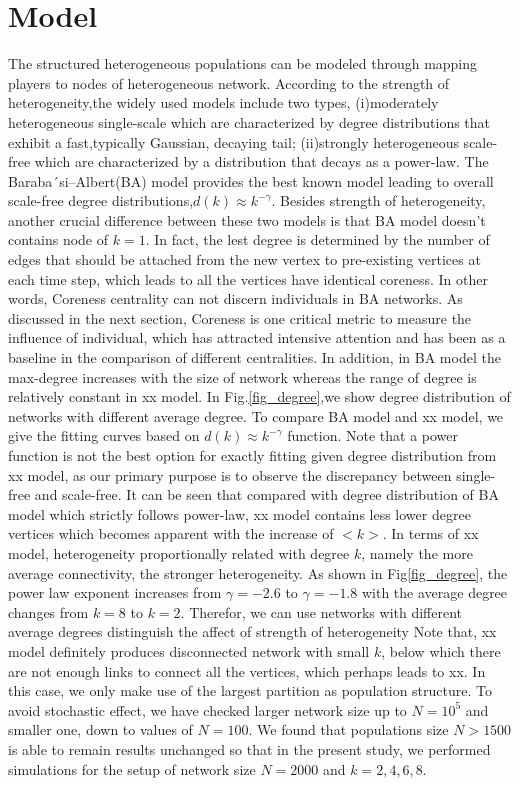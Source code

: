 \documentclass[preprint,12pt,3p]{elsarticle}
\begin{document}
\section{Model}

\label{network model}
The structured heterogeneous populations can be modeled through mapping players to
nodes of heterogeneous network.
According to the strength of heterogeneity,the widely used models include two types,
(i)moderately heterogeneous single-scale which are characterized by degree distributions that exhibit a fast,typically Gaussian, decaying tail\cite{AmaralScala-18327};
(ii)strongly heterogeneous scale-free which are characterized by a distribution that decays as a power-law. The Baraba´si–Albert(BA) model provides the best known model leading to overall scale-free degree distributions,$d(k)\approx k^{-\gamma}$.
Besides strength of heterogeneity, another crucial difference between these two models is that BA model
doesn't contains node of $k=1$. In fact, the lest degree is determined by the number of edges that should be attached from the new vertex to pre-existing vertices at each time step, which leads to all the vertices have identical coreness. In other words, Coreness centrality can not discern individuals in BA networks. As discussed in the next section, Coreness is one critical metric to measure the influence of individual, which has attracted intensive attention and has been as a baseline in the comparison of different centralities.
In addition, in BA model the max-degree increases with the size of network whereas the range of degree is relatively constant in xx model.
In Fig.\ref{fig_degree},we show degree distribution of networks with different average degree. To compare BA model and xx model, we give the fitting curves based on $d(k)\approx k^{-\gamma}$ function. Note that a power function is not the best option for exactly fitting given degree distribution from xx model, as our primary purpose is to observe the discrepancy between single-free and scale-free.
It can be seen that compared with degree distribution of BA model which strictly follows power-law, xx model contains less lower degree vertices which becomes apparent with the increase of $<k>$.
In terms of xx model, heterogeneity proportionally related with degree $k$, namely the more average connectivity, the stronger heterogeneity. As shown in Fig\ref{fig_degree}, the power law exponent increases from  $\gamma=-2.6$ to $\gamma=-1.8$ with the average degree changes from $k=8$ to $k=2$.
Therefor, we can use networks with different average degrees distinguish the affect of strength of heterogeneity
Note that, xx model definitely produces disconnected network with small $k$, below which there are not
enough links to connect all the vertices, which perhaps leads to xx.
In this case, we only make use of the largest partition as population structure.
To avoid stochastic effect, we have checked larger network size up to $N=10^5$ and smaller one,
down to values of $N=100$.
We found that populations size $N>1500$ is able to remain results unchanged so that in the present study,
we performed simulations for the setup of network size $N=2000$ and $k=2,4,6,8$.
\end{document}
